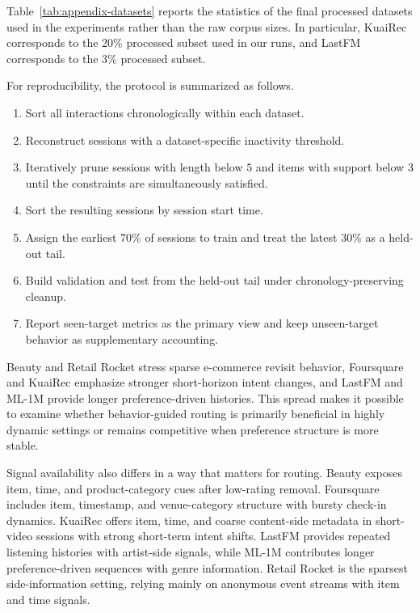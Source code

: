 \documentclass[sigconf,review,anonymous]{acmart}
\begin{document}
Table~\ref{tab:appendix-datasets} reports the statistics of the final processed datasets used in the experiments rather than the raw corpus sizes. In particular, KuaiRec corresponds to the 20\% processed subset used in our runs, and LastFM corresponds to the 3\% processed subset.

For reproducibility, the protocol is summarized as follows.
\begin{enumerate}
  \item Sort all interactions chronologically within each dataset.
  \item Reconstruct sessions with a dataset-specific inactivity threshold.
  \item Iteratively prune sessions with length below $5$ and items with support below $3$ until the constraints are simultaneously satisfied.
  \item Sort the resulting sessions by session start time.
  \item Assign the earliest 70\% of sessions to train and treat the latest 30\% as a held-out tail.
  \item Build validation and test from the held-out tail under chronology-preserving cleanup.
  \item Report seen-target metrics as the primary view and keep unseen-target behavior as supplementary accounting.
\end{enumerate}

Beauty and Retail Rocket stress sparse e-commerce revisit behavior, Foursquare and KuaiRec emphasize stronger short-horizon intent changes, and LastFM and ML-1M provide longer preference-driven histories. This spread makes it possible to examine whether behavior-guided routing is primarily beneficial in highly dynamic settings or remains competitive when preference structure is more stable.

Signal availability also differs in a way that matters for routing. Beauty exposes item, time, and product-category cues after low-rating removal. Foursquare includes item, timestamp, and venue-category structure with bursty check-in dynamics. KuaiRec offers item, time, and coarse content-side metadata in short-video sessions with strong short-term intent shifts. LastFM provides repeated listening histories with artist-side signals, while ML-1M contributes longer preference-driven sequences with genre information. Retail Rocket is the sparsest side-information setting, relying mainly on anonymous event streams with item and time signals.
\end{document}
